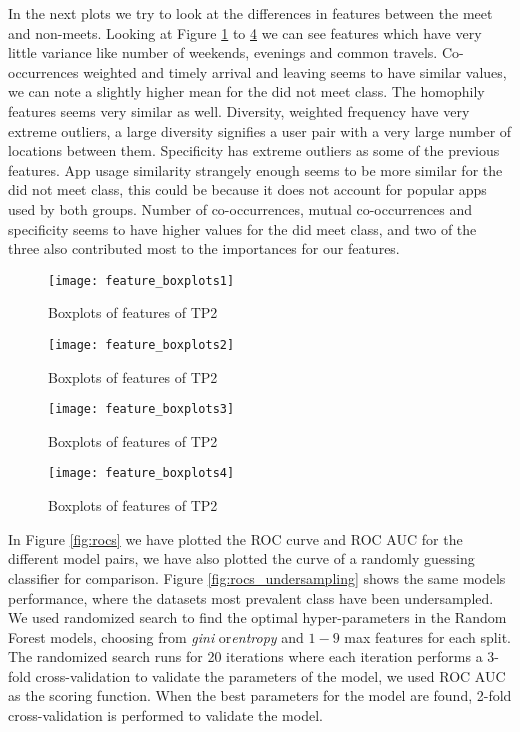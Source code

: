 In the next plots we try to look at the differences in features between the meet and non-meets.
Looking at Figure \ref{fig:feature_boxplots1} to \ref{fig:feature_boxplots4} we can see features which have very little variance like number of weekends, evenings and common travels. Co-occurrences weighted and timely arrival and leaving seems to have similar values, we can note a slightly higher mean for the did not meet class. The homophily features seems very similar as well. Diversity, weighted frequency have very extreme outliers, a large diversity signifies a user pair with a very large number of locations between them. Specificity has extreme outliers as some of the previous features. App usage similarity strangely enough seems to be more similar for the did not meet class, this could be because it does not account for popular apps used by both groups. Number of co-occurrences, mutual co-occurrences and specificity seems to have higher values for the did meet class, and two of the three also contributed most to the importances for our features.

\begin{figure}[H]
    \hspace*{-1.0cm}
    \centering
    \texttt{[image: feature\_boxplots1]}
    \caption{Boxplots of features of TP2}
    \label{fig:feature_boxplots1}
\end{figure}

\begin{figure}[H]
    \hspace*{-1.0cm}
    \centering
    \texttt{[image: feature\_boxplots2]}
    \caption{Boxplots of features of TP2}
    \label{fig:feature_boxplots2}
\end{figure}
\begin{figure}[H]
    \hspace*{-1.0cm}
    \centering
    \texttt{[image: feature\_boxplots3]}
    \caption{Boxplots of features of TP2}
    \label{fig:feature_boxplots3}
\end{figure}
\begin{figure}[H]
    \hspace*{-1.0cm}
    \centering
    \texttt{[image: feature\_boxplots4]}
    \caption{Boxplots of features of TP2}
    \label{fig:feature_boxplots4}
\end{figure}
In Figure \ref{fig:rocs} we have plotted the ROC curve and ROC AUC for the different model pairs, we have also plotted the curve of a randomly guessing classifier for comparison. Figure \ref{fig:rocs_undersampling} shows the same models performance, where the datasets most prevalent class have been undersampled. We used randomized search to find the optimal hyper-parameters in the Random Forest models, choosing from \textit{gini} or\textit{entropy} and $1-9$ max features for each split. The randomized search runs for 20 iterations where each iteration performs a 3-fold cross-validation to validate the parameters of the model, we used ROC AUC as the scoring function. When the best parameters for the model are found, 2-fold cross-validation is performed to validate the model.

